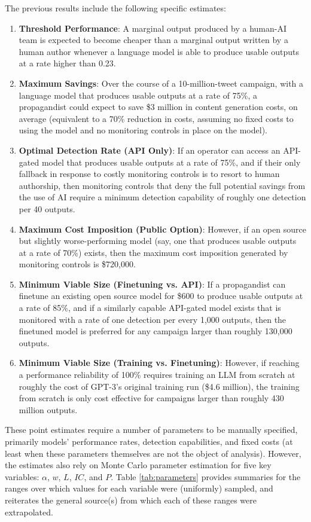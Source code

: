 \documentclass{article}
\begin{document}
The previous results include the following specific estimates: 

\begin{enumerate}
  \item \textbf{Threshold Performance}: A marginal output produced by a human-AI team is expected to become cheaper than a marginal output written by a human author whenever a language model is able to produce usable outputs at a rate higher than 0.23.
  \item \textbf{Maximum Savings}: Over the course of a 10-million-tweet campaign, with a language model that produces usable outputs at a rate of 75\%, a propagandist could expect to save \$3 million in content generation costs, on average (equivalent to a 70\% reduction in costs, assuming no fixed costs to using the model and no monitoring controls in place on the model).
  \item \textbf{Optimal Detection Rate (API Only)}: If an operator can access an API-gated model that produces usable outputs at a rate of 75\%, and if their only fallback in response to costly monitoring controls is to resort to human authorship, then monitoring controls that deny the full potential savings from the use of AI require a minimum detection capability of roughly one detection per 40 outputs. 
  \item \textbf{Maximum Cost Imposition (Public Option)}: However, if an open source but slightly worse-performing model (say, one that produces usable outputs at a rate of 70\%) exists, then the maximum cost imposition generated by monitoring controls is \$720,000.
  \item \textbf{Minimum Viable Size (Finetuning vs. API)}: If a propagandist can finetune an existing open source model for \$600 to produce usable outputs at a rate of 85\%, and if a similarly capable API-gated model exists that is monitored with a rate of one detection per every 1,000 outputs, then the finetuned model is preferred for any campaign larger than roughly 130,000 outputs.
  \item \textbf{Minimum Viable Size (Training vs. Finetuning)}: However, if reaching a performance reliability of 100\% requires training an LLM from scratch at roughly the cost of GPT-3's original training run (\$4.6 million), the training from scratch is only cost effective for campaigns larger than roughly 430 million outputs.
\end{enumerate}

These point estimates require a number of parameters to be manually specified, primarily models' performance rates, detection capabilities, and fixed costs (at least when these parameters themselves are not the object of analysis). However, the estimates also rely on Monte Carlo parameter estimation for five key variables: $\alpha$, $w$, $L$, $IC$, and $P$. Table \ref{tab:parameters} provides summaries for the ranges over which values for each variable were (uniformly) sampled, and reiterates the general source(s) from which each of these ranges were extrapolated. 
\end{document}
